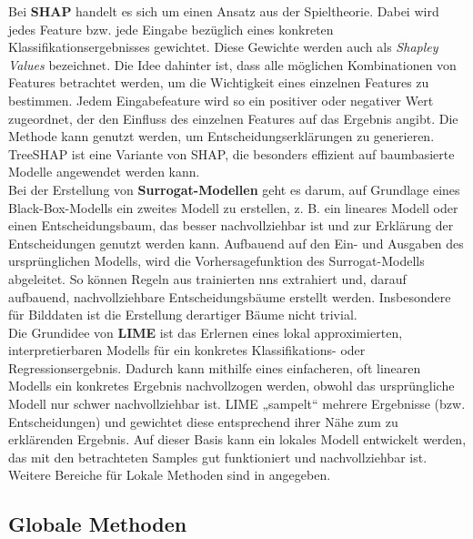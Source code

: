 \documentclass[twoside, 12pt,a4paper]{book}
\numberwithin{equation}{section}
\begin{document}
	
	\noindent Bei \textbf{SHAP} handelt es sich um einen Ansatz aus der Spieltheorie. Dabei wird jedes Feature bzw. jede Eingabe bezüglich eines konkreten  Klassifikationsergebnisses gewichtet. Diese 
	Gewichte werden auch als \textit{Shapley Values} bezeichnet. Die Idee dahinter ist, dass alle möglichen Kombinationen von Features betrachtet werden, um die Wichtigkeit eines einzelnen Features zu bestimmen. Jedem Eingabefeature wird so ein positiver oder negativer Wert 
	zugeordnet, der den Einfluss des einzelnen Features auf das Ergebnis angibt. Die Methode kann genutzt werden, um Entscheidungserklärungen zu generieren. TreeSHAP ist eine Variante von SHAP, die besonders effizient auf baumbasierte Modelle angewendet werden kann.\\
	

	
	\noindent Bei der Erstellung von \textbf{Surrogat-Modellen} geht es darum, auf Grundlage eines Black-Box-Modells ein zweites Modell zu erstellen, z. B. ein lineares Modell oder einen Entscheidungsbaum, das besser nachvollziehbar ist und zur Erklärung der Entscheidungen genutzt werden kann. Aufbauend auf den Ein- und Ausgaben des ursprünglichen Modells, wird die Vorhersagefunktion des Surrogat-Modells abgeleitet. So können Regeln aus trainierten 
	\acp{nn} extrahiert und, darauf aufbauend, nachvollziehbare Entscheidungsbäume erstellt werden. Insbesondere für Bilddaten ist die Erstellung derartiger Bäume nicht trivial.\\
	
	\noindent Die Grundidee von \textbf{LIME} ist das Erlernen eines lokal approximierten, interpretierbaren Modells für ein konkretes 
	Klassifikations-­ oder Regressionsergebnis. Dadurch 
	kann mithilfe eines einfacheren, oft linearen Modells ein konkretes Ergebnis nachvollzogen werden, obwohl das ursprüngliche Modell nur schwer nachvollziehbar ist. LIME „sampelt“ mehrere Ergebnisse (bzw. Entscheidungen) und gewichtet diese entsprechend ihrer Nähe zum zu erklärenden Ergebnis. Auf dieser Basis kann ein lokales Modell entwickelt werden, das mit den betrachteten Samples gut funktioniert und nachvollziehbar ist.\\
	
	\noindent Weitere Bereiche für Lokale Methoden sind in \cite{kistudie} angegeben.
	

	
	\subsection{Globale Methoden}
	
\end{document}
